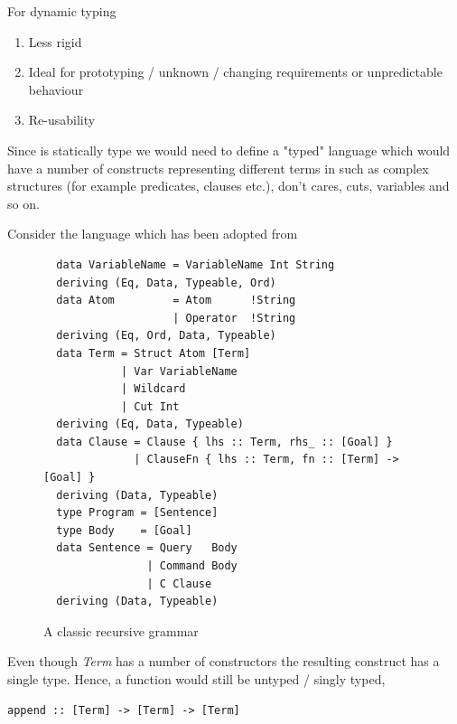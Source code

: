 \documentclass[thesis-solanki.tex]{subfiles}
\begin{document}
For dynamic typing
\begin{enumerate}
\item Less rigid
\item Ideal for prototyping / unknown / changing requirements or unpredictable behaviour 
\item Re-usability  
\end{enumerate}

Since  is statically type we would need to define a "typed" language which would have a
number of constructs representing different terms in  such as complex structures (for example
predicates, clauses etc.), don't cares, cuts, variables and so on.

Consider the language  which has been adopted from
\cite{prolog-lib}

\begin{figure}
\begin{verbatim}   
  data VariableName = VariableName Int String
  deriving (Eq, Data, Typeable, Ord)
  data Atom         = Atom      !String
                    | Operator  !String
  deriving (Eq, Ord, Data, Typeable)
  data Term = Struct Atom [Term]
            | Var VariableName
            | Wildcard
            | Cut Int
  deriving (Eq, Data, Typeable)
  data Clause = Clause { lhs :: Term, rhs_ :: [Goal] }
              | ClauseFn { lhs :: Term, fn :: [Term] -> [Goal] }
  deriving (Data, Typeable)
  type Program = [Sentence]
  type Body    = [Goal]
  data Sentence = Query   Body
                | Command Body
                | C Clause
  deriving (Data, Typeable)
\end{verbatim}
  \caption{A classic recursive grammar}
  \label{tab:closed-terms}
\end{figure}

Even though \textit{Term} has a number of constructors the resulting construct has a single type. Hence, a function would still be untyped 
/ singly typed,\par
\begin{verbatim}
append :: [Term] -> [Term] -> [Term]
\end{verbatim} 

\end{document}
